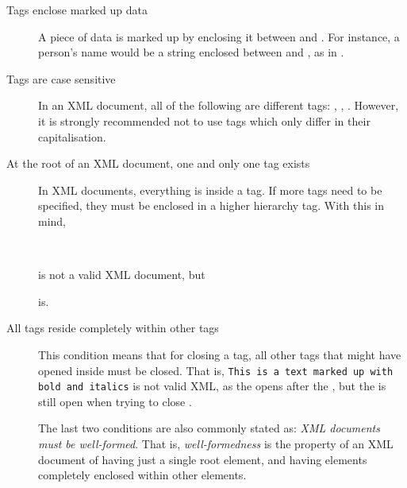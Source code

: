 		\begin{description}
			\item[Tags enclose marked up data] A piece of data is
			marked up by enclosing it between  and
			. For instance, a person's name would be
			a string enclosed between  and
			, as in .
			
			\item[Tags are case sensitive] In an XML document, all
			of the following are different tags: ,
			, . However, it is strongly
			recommended not to use tags which only differ in their
			capitalisation.
			
			\item[At the root of an XML document, one and only one
			tag exists] In XML documents,
			everything is inside a tag. If more tags need to be
			specified, they must be enclosed in a higher hierarchy
			tag. With this in mind,
			
			\\
			
			\noindent is not a valid XML document, but
			
			
			\noindent is.
			
			\item[All tags reside completely within other tags]
			This condition means that for closing a tag, all other
			tags that might have opened inside must be closed. That
			is, \texttt{This is a text
			marked up with bold and italics}
			 is not valid XML, as the
			 opens after the , but the
			 is still open when trying to close
			.
			
			The last two conditions are also commonly stated as:
			\emph{XML documents must be well-formed}. That is,
			\emph{well-formedness} is the property of an XML
			document of having just a single root element, and
			having elements completely enclosed within other
			elements.
		\end{description}
		
